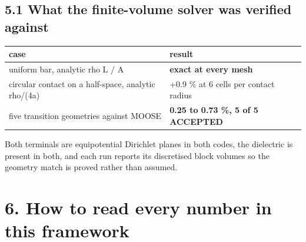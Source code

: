 \documentclass[10pt,]{article}
\begin{document}
\hypertarget{what-the-finite-volume-solver-was-verified-against}{%
\subsection{5.1 What the finite-volume solver was verified
against}\label{what-the-finite-volume-solver-was-verified-against}}

\begin{longtable}[]{@{}ll@{}}
\toprule
\begin{minipage}[b]{0.47\columnwidth}\raggedright
case\strut
\end{minipage} & \begin{minipage}[b]{0.47\columnwidth}\raggedright
result\strut
\end{minipage}\tabularnewline
\midrule
\endhead
\begin{minipage}[t]{0.47\columnwidth}\raggedright
uniform bar, analytic rho L / A\strut
\end{minipage} & \begin{minipage}[t]{0.47\columnwidth}\raggedright
\textbf{exact at every mesh}\strut
\end{minipage}\tabularnewline
\begin{minipage}[t]{0.47\columnwidth}\raggedright
circular contact on a half-space, analytic rho/(4a)\strut
\end{minipage} & \begin{minipage}[t]{0.47\columnwidth}\raggedright
+0.9 \% at 6 cells per contact radius\strut
\end{minipage}\tabularnewline
\begin{minipage}[t]{0.47\columnwidth}\raggedright
five transition geometries against MOOSE\strut
\end{minipage} & \begin{minipage}[t]{0.47\columnwidth}\raggedright
\textbf{0.25 to 0.73 \%, 5 of 5 ACCEPTED}\strut
\end{minipage}\tabularnewline
\bottomrule
\end{longtable}

Both terminals are equipotential Dirichlet planes in both codes, the
dielectric is present in both, and each run reports its discretised
block volumes so the geometry match is proved rather than assumed.

\newpage

\hypertarget{how-to-read-every-number-in-this-framework}{%
\section{6. How to read every number in this
framework}\label{how-to-read-every-number-in-this-framework}}
\end{document}
